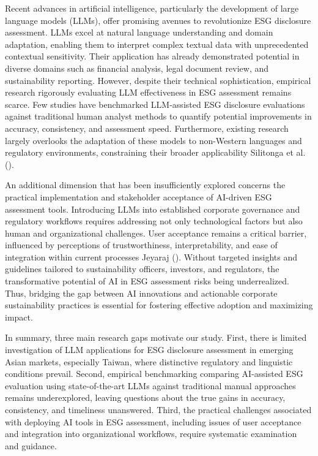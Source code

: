 \documentclass[
  12pt,
]{article}
\begin{document}
Recent advances in artificial intelligence, particularly the development
of large language models (LLMs), offer promising avenues to
revolutionize ESG disclosure assessment. LLMs excel at natural language
understanding and domain adaptation, enabling them to interpret complex
textual data with unprecedented contextual sensitivity. Their
application has already demonstrated potential in diverse domains such
as financial analysis, legal document review, and sustainability
reporting. However, despite their technical sophistication, empirical
research rigorously evaluating LLM effectiveness in ESG assessment
remains scarce. Few studies have benchmarked LLM-assisted ESG disclosure
evaluations against traditional human analyst methods to quantify
potential improvements in accuracy, consistency, and assessment speed.
Furthermore, existing research largely overlooks the adaptation of these
models to non-Western languages and regulatory environments,
constraining their broader applicability Silitonga et al.
().

An additional dimension that has been insufficiently explored concerns
the practical implementation and stakeholder acceptance of AI-driven ESG
assessment tools. Introducing LLMs into established corporate governance
and regulatory workflows requires addressing not only technological
factors but also human and organizational challenges. User acceptance
remains a critical barrier, influenced by perceptions of
trustworthiness, interpretability, and ease of integration within
current processes Jeyaraj (). Without
targeted insights and guidelines tailored to sustainability officers,
investors, and regulators, the transformative potential of AI in ESG
assessment risks being underrealized. Thus, bridging the gap between AI
innovations and actionable corporate sustainability practices is
essential for fostering effective adoption and maximizing impact.

In summary, three main research gaps motivate our study. First, there is
limited investigation of LLM applications for ESG disclosure assessment
in emerging Asian markets, especially Taiwan, where distinctive
regulatory and linguistic conditions prevail. Second, empirical
benchmarking comparing AI-assisted ESG evaluation using state-of-the-art
LLMs against traditional manual approaches remains underexplored,
leaving questions about the true gains in accuracy, consistency, and
timeliness unanswered. Third, the practical challenges associated with
deploying AI tools in ESG assessment, including issues of user
acceptance and integration into organizational workflows, require
systematic examination and guidance.
\end{document}
